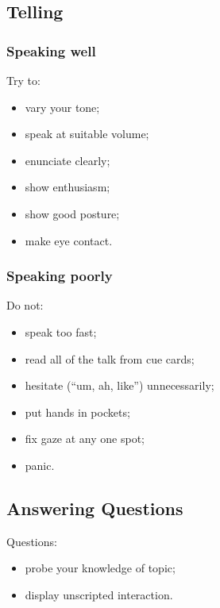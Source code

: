 \documentclass{beamer}
\begin{document}
\subsection{Telling}

\begin{frame}

\frametitle{Speaking well}

Try to:
\begin{itemize}
\item vary your tone;
\item speak at suitable volume;
\item enunciate clearly;
\item show enthusiasm;
\item show good posture;
\item make eye contact.
\end{itemize}

\end{frame}

\begin{frame}

\frametitle{Speaking poorly}

Do not:
\begin{itemize}
\item speak too fast;
\item read all of the talk from cue cards;
\item hesitate (``um, ah, like'') unnecessarily;
\item put hands in pockets;
\item fix gaze at any one spot;
\item panic.
\end{itemize}

\end{frame}


\subsection{Answering Questions}

\begin{frame}

\Large
Questions:

\begin{itemize}
\item probe your knowledge of topic;
\item display unscripted interaction.
\end{itemize}

\end{frame}
\end{document}
